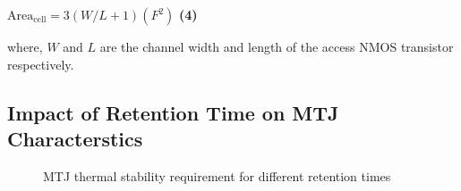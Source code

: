  {
 \small{
 \hspace{55mm} $\mathrm{Area}_{\mathrm{cell}}={3\left(W/L+1\right)}(F^2)$ \hspace{3mm} \textbf{(4)}
 }
 }

where, $W$ and $L$ are the channel width and length of the access NMOS transistor respectively.

\subsection{Impact of Retention Time on MTJ Characterstics} \label{subsec:retention}

\begin{wrapfigure}{l}{0.50\textwidth}
\centering
  \caption{\label{fig:retention} MTJ thermal stability requirement for different retention times}
\end{wrapfigure}

